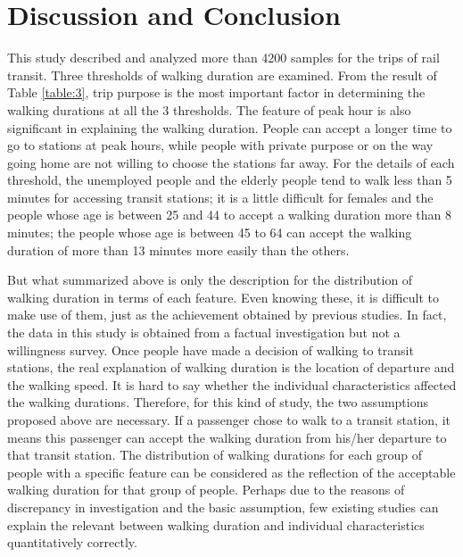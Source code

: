 \documentclass[Journal,letterpaper]{ascelike-new}
\begin{document}
\section{Discussion and Conclusion}
This study described and analyzed more than 4200 samples for the trips of rail transit. Three thresholds of walking duration are examined. From the result of Table \ref{table:3}, trip purpose is the most important factor in determining the walking durations at all the 3 thresholds. The feature of peak hour is also significant in explaining the walking duration. People can accept a longer time to go to stations at peak hours, while people with private purpose or on the way going home are not willing to choose the stations far away. For the details of each threshold, the unemployed people and the elderly people tend to walk less than 5 minutes for accessing transit stations; it is a little difficult for females and the people whose age is between 25 and 44 to accept a walking duration more than 8 minutes; the people whose age is between 45 to 64 can accept the walking duration of more than 13 minutes more easily than the others.

%
But what summarized above is only the description for the distribution of walking duration in terms of each feature. Even knowing these, it is difficult to make use of them, just as the achievement obtained by previous studies. In fact, the data in this study is obtained from a factual investigation but not a willingness survey. Once people have made a decision of walking to transit stations, the real explanation of walking duration is the location of departure and the walking speed. It is hard to say whether the individual characteristics affected the walking durations. Therefore, for this kind of study, the two assumptions proposed above are necessary. If a passenger chose to walk to a transit station, it means this passenger can accept the walking duration from his/her departure to that transit station. The distribution of walking durations for each group of people with a specific feature can be considered as the reflection of the acceptable walking duration for that group of people. Perhaps due to the reasons of discrepancy in investigation and the basic assumption, few existing studies can explain the relevant between walking duration and individual characteristics quantitatively correctly.
\end{document}
